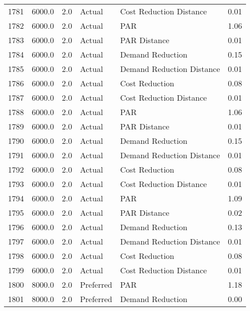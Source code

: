 \begin{longtable}{lrrllr}
1781 &       6000.0 &     2.0 &         Actual &    Cost Reduction Distance &   0.01 \\
1782 &       6000.0 &     2.0 &         Actual &                        PAR &   1.06 \\
1783 &       6000.0 &     2.0 &         Actual &               PAR Distance &   0.01 \\
1784 &       6000.0 &     2.0 &         Actual &           Demand Reduction &   0.15 \\
1785 &       6000.0 &     2.0 &         Actual &  Demand Reduction Distance &   0.01 \\
1786 &       6000.0 &     2.0 &         Actual &             Cost Reduction &   0.08 \\
1787 &       6000.0 &     2.0 &         Actual &    Cost Reduction Distance &   0.01 \\
1788 &       6000.0 &     2.0 &         Actual &                        PAR &   1.06 \\
1789 &       6000.0 &     2.0 &         Actual &               PAR Distance &   0.01 \\
1790 &       6000.0 &     2.0 &         Actual &           Demand Reduction &   0.15 \\
1791 &       6000.0 &     2.0 &         Actual &  Demand Reduction Distance &   0.01 \\
1792 &       6000.0 &     2.0 &         Actual &             Cost Reduction &   0.08 \\
1793 &       6000.0 &     2.0 &         Actual &    Cost Reduction Distance &   0.01 \\
1794 &       6000.0 &     2.0 &         Actual &                        PAR &   1.09 \\
1795 &       6000.0 &     2.0 &         Actual &               PAR Distance &   0.02 \\
1796 &       6000.0 &     2.0 &         Actual &           Demand Reduction &   0.13 \\
1797 &       6000.0 &     2.0 &         Actual &  Demand Reduction Distance &   0.01 \\
1798 &       6000.0 &     2.0 &         Actual &             Cost Reduction &   0.08 \\
1799 &       6000.0 &     2.0 &         Actual &    Cost Reduction Distance &   0.01 \\
1800 &       8000.0 &     2.0 &      Preferred &                        PAR &   1.18 \\
1801 &       8000.0 &     2.0 &      Preferred &           Demand Reduction &   0.00 \\

\end{longtable}
